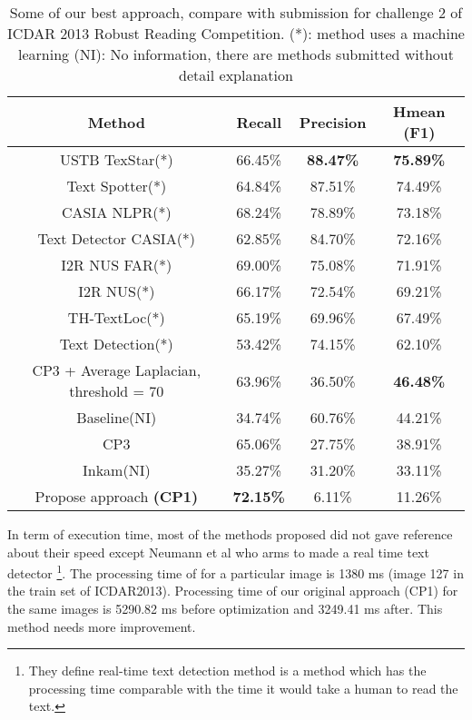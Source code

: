 \begin {table}[H]
\caption{Some of our best approach, compare with submission for challenge 2 of ICDAR 2013 Robust Reading Competition. (*): method uses a machine learning (NI): No information, there are methods submitted without detail explanation}\label{tab:Comparation} 
\begin{tabular}{|c|c|c|c|}
\hline 
\textbf{Method} & \textbf{Recall} & \textbf{Precision} & \textbf{Hmean (F1)} \\ 
\hline 
USTB TexStar(*) & 66.45\% & \textbf{88.47\%} & \textbf{75.89\%} \\ 
\hline 
Text Spotter(*) & 64.84\% & 87.51\% & 74.49\% \\ 
\hline 
CASIA NLPR(*)  & 68.24\% & 78.89\% & 73.18\% \\ 
\hline 
Text Detector CASIA(*) & 62.85\% & 84.70\% & 72.16\% \\ 
\hline 
I2R NUS FAR(*) & 69.00\% & 75.08\% & 71.91\% \\ 
\hline 
I2R NUS(*) & 66.17\% & 72.54\% & 69.21\% \\ 
\hline 
TH-TextLoc(*) & 65.19\% & 69.96\% & 67.49\% \\ 
\hline 
Text Detection(*) & 53.42\% & 74.15\% & 62.10\% \\ 
\hline 
CP3 + Average Laplacian, threshold = 70 & 63.96\% & 36.50\% & \textbf{46.48\%} \\ 
\hline 
Baseline(NI) & 34.74\% & 60.76\% & 44.21\%\\ 
\hline 
CP3 & 65.06\% & 27.75\% & 38.91\% \\ 
\hline 
Inkam(NI) & 35.27\% & 31.20\% & 33.11\% \\ 
\hline 
Propose approach \textbf{(CP1)} &\textbf{ \textbf{72.15\%}} & 6.11\% & 11.26\% \\
\hline 
\end{tabular} 
\end{table}

In term of execution time, most of the methods proposed did not gave reference about their speed except Neumann et al \cite{Neumann12} who arms to made a real time text detector \footnote{They define real-time text detection method is a method which has the processing time comparable with the time it would take a human to read the text.}. The processing time of \cite{Neumann12} for a particular image is 1380 ms (image 127 in the train set of ICDAR2013). Processing time of our original approach (CP1) for the same images is 5290.82 ms before optimization and 3249.41 ms after. This method needs more improvement.







